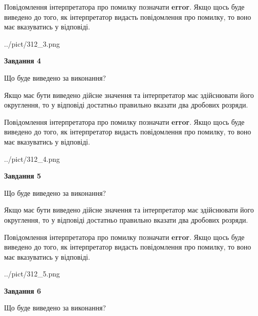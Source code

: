 \documentclass[12pt, ukrainian]{article}
\begin{document}
{\begin {Large}
Повідомлення інтерпретатора про помилку позначати \textbf{error}.
Якщо щось буде виведено до того, як інтерпретатор видасть повідомлення про помилку, 
то воно має вказуватись у відповіді. \par

\begin{center}
	{../pict/312_3.png}
\end{center}
\newpage

{\begin {center}\textbf{Завдання 4}\end {center}}\par
Що буде виведено за виконання? \par

Якщо має бути виведено дійсне значення та інтерпретатор має здійснювати його округлення, 
то у відповіді достатньо правильно вказати два дробових розряди.

Повідомлення інтерпретатора про помилку позначати \textbf{error}.
Якщо щось буде виведено до того, як інтерпретатор видасть повідомлення про помилку, 
то воно має вказуватись у відповіді. \par

\begin{center}
	{../pict/312_4.png}
\end{center}
\newpage

{\begin {center}\textbf{Завдання 5}\end {center}}\par
Що буде виведено за виконання? \par

Якщо має бути виведено дійсне значення та інтерпретатор має здійснювати його округлення, 
то у відповіді достатньо правильно вказати два дробових розряди.

Повідомлення інтерпретатора про помилку позначати \textbf{error}.
Якщо щось буде виведено до того, як інтерпретатор видасть повідомлення про помилку, 
то воно має вказуватись у відповіді. \par

\begin{center}
	{../pict/312_5.png}
\end{center}
\newpage

{\begin {center}\textbf{Завдання 6}\end {center}}\par
Що буде виведено за виконання? \par


\end{Large}}
\end{document}
